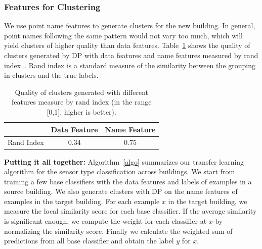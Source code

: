 \subsubsection{Features for Clustering}
We use point name features to generate clusters for the new building. In general, point names following the same pattern would not vary too much, which will yield clusters of higher quality than data features.
Table~\ref{quality} shows the quality of clusters generated by DP with data features and name features measured by rand index~\cite{rand}. Rand index is a standard measure of the similarity between the grouping in clusters and the true labels.

\begin{table}[h]
\centering
\begin{tabular}{l|c|c}
\hline
                & Data Feature & Name Feature \\ \hline
Rand Index & 0.34       & 0.75       \\ \hline
\end{tabular}
\caption{Quality of clusters generated with different features measure by rand index (in the range [0,1], higher is better).}
\label{quality}
\end{table}

{\bf Putting it all together:} Algorithm~\ref{algo} summarizes our transfer learning algorithm for the sensor type classification across buildings. We start from training a few base classifiers with the data features and labels of examples in a source building. We also generate clusters with DP on the name features of examples in the target building. For each example $x$ in the target building, we measure the local similarity score for each base classifier. If the average similarity is significant enough, we compute the weight for each classifier at $x$ by normalizing the similarity score. Finally we calculate the weighted sum of predictions from all base classifier and obtain the label $y$ for $x$.

